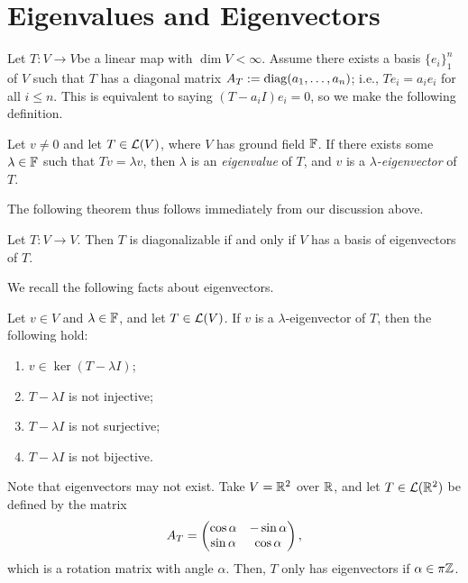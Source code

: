 \documentclass{article}
\begin{document}
\section{Eigenvalues and Eigenvectors}
Let $T: V\to V$be a linear map with $\dim V < \infty$. Assume there exists a basis $\{e_i\}_1^n$ of $V$ such that $T$ has a diagonal matrix $A_T := \operatorname{diag}(a_1, \ldots, a_n)$; i.e., $Te_i = a_ie_i$ for all $i\leq n$. This is equivalent to saying $(T - a_iI)e_i = 0$, so we make the following definition.
\begin{definition}
Let $v\neq 0$ and let $T\in\mathcal L(V)$, where $V$ has ground field $\mathbb F$. If there exists some $\lambda\in\mathbb F$ such that $Tv = \lambda v$, then $\lambda$ is an \textit{eigenvalue} of $T$, and $v$ is a \textit{$\lambda$-eigenvector} of $T$.
\end{definition}

The following theorem thus follows immediately from our discussion above.
\begin{theorem}
Let $T: V\to V$. Then $T$ is diagonalizable if and only if $V$ has a basis of eigenvectors of $T$.
\end{theorem}

We recall the following facts about eigenvectors.
\newpage
\begin{proposition}
Let $v\in V$ and $\lambda\in\mathbb F$, and let $T\in\mathcal L(V)$. If $v$ is a $\lambda$-eigenvector of $T$, then the following hold:
\begin{enumerate}
    \item $v\in \ker(T-\lambda I)$;
    \item $T-\lambda I$ is not injective;
    \item $T-\lambda I$ is not surjective;
    \item $T-\lambda I$ is not bijective.
\end{enumerate}
\end{proposition}
\begin{remark}
Note that eigenvectors may not exist. Take $V = \mathbb R^2$ over $\mathbb R$, and let $T\in\mathcal L(\mathbb R^2)$ be defined by the matrix
$$A_T = \begin{pmatrix}\cos\alpha & -\sin\alpha \\ \sin \alpha & \cos\alpha \end{pmatrix},$$
which is a rotation matrix with angle $\alpha$. Then, $T$ only has eigenvectors if $\alpha\in\pi\mathbb Z$.
\end{remark}
\end{document}
